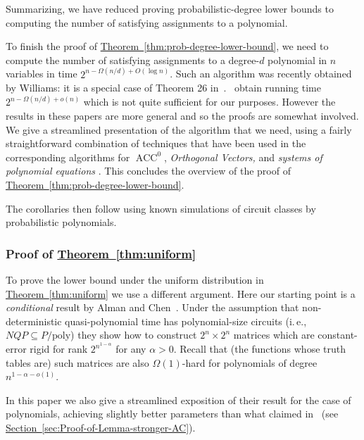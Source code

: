 \documentclass[11pt]{article}
\newcommand{\expref}[2]{\texorpdfstring{\hyperref[#2]{#1~\ref{#2}}}{#1~\ref{#2}}}
\newcommand{\ie}{i.\,e.}
\DeclareMathOperator{\ACC}{\mathrm{ACC}}  %
\newcommand{\poly}{\mathrm{poly}}
\begin{document}
\medskip

Summarizing, we have reduced proving probabilistic-degree lower bounds
to computing the number of satisfying assignments to a polynomial.

\medskip

To finish the proof of \expref{Theorem}{thm:prob-degree-lower-bound},
we need to compute the number of satisfying assignments to a degree-$d$
polynomial in $n$ variables in time $2^{n-\Omega(n/d)+O(\log n)}$.
Such an algorithm was recently obtained by Williams: it is a special
case of Theorem 26 in~\cite{DBLP:conf/coco/Williams18}.~\cite{DBLP:conf/soda/LokshtanovPTWY17}
obtain running time $2^{n-\Omega(n/d)+o(n)}$ which is not quite sufficient
for our purposes. However the results in these papers are more general
and so the proofs are somewhat involved. We give a streamlined presentation
of the algorithm that we need, using a fairly straightforward combination
of techniques that have been used in the corresponding algorithms
for $\ACC^{0}$, \emph{Orthogonal Vectors, }and \emph{systems of polynomial
equations} \cite{Williams14-acc-jacm,DBLP:conf/soda/ChanW16,DBLP:conf/soda/LokshtanovPTWY17}.
This concludes the overview of the proof of \expref{Theorem}{thm:prob-degree-lower-bound}.

The corollaries then follow using known simulations of circuit classes
by probabilistic polynomials.

\subsubsection{Proof of \expref{Theorem}{thm:uniform}}

To prove the lower bound under the uniform distribution
in \expref{Theorem}{thm:uniform} we use a different argument. Here our starting
point is a \emph{conditional }result by Alman and Chen~\cite{AlmanC19}.
Under the assumption that non-deterministic quasi-polynomial time
has polynomial-size circuits (\ie, $NQP\subseteq P/\poly$) they
show how to construct $2^{n}\times2^{n}$ matrices which are constant-error
rigid for rank $2^{n^{1-\alpha}}$ for any $\alpha>0$. Recall that
(the functions whose truth tables are) such matrices are also $\Omega(1)$-hard
for polynomials of degree $n^{1-\alpha-o(1)}$.

In this paper we also give a streamlined exposition of their result
for the case of polynomials, achieving slightly better parameters
than what claimed in~\cite{AlmanC19} (see \expref{Section}{sec:Proof-of-Lemma-stronger-AC}).
\end{document}
